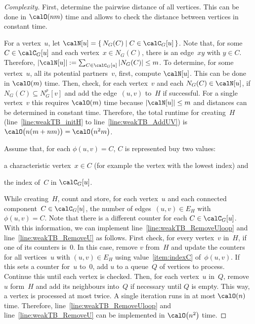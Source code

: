\begin{proof}
    [Complexity]
First, determine the pairwise distance of all vertices.
This can be done in $\calO(nm)$ time and allows to check the distance between vertices in constant time.

For a vertex~$u$, let $\calN[u] = \{ \, N_G(C) \mid C \in \calC_G[u] \, \}$.
Note that, for some $C \in \calC_G[u]$ and each vertex~$x \in N_G(C)$, there is an edge~$xy$ with $y \in C$.
Therefore, $|\calN[u]| := \sum_{C \in \calC_G[u]} |N_G(C)| \leq m$.
To determine, for some vertex~$u$, all its potential partners~$v$, first, compute $\calN[u]$.
This can be done in $\calO(m)$ time.
Then, check, for each vertex~$v$ and each $N_G(C) \in \calN[u]$, if $N_G(C) \subseteq N_G^\rho[v]$ and add the edge~$(u, v)$ to~$H$ if successful.
For a single vertex~$v$ this requires $\calO(m)$ time because $|\calN[u]| \leq m$ and distances can be determined in constant time.
Therefore, the total runtime for creating~$H$ (line~\ref{line:weakTB_initH} to line~\ref{line:weakTB_AddUV}) is $\calO \big( n (m + nm) \big) = \calO \big( n^2m \big)$.

Assume that, for each $\phi(u, v) = C$, $C$ is represented buy two values:
\begin{enumerate*}[(i),mode=unboxed]
    \item
        \label{item:charVert}
        a characteristic vertex~$x \in C$ (for example the vertex with the lowest index) and
    \item
        \label{item:indexC}
        the index of~$C$ in $\calC_G[u]$.
\end{enumerate*}
While creating~$H$, count and store, for each vertex~$u$ and each connected component~$C \in \calC_G[u]$, the number of edges~$(u, v) \in E_H$ with $\phi(u, v) = C$.
Note that there is a different counter for each $C \in \calC_G[u]$.
With this information, we can implement line~\ref{line:weakTB_RemoveUloop} and line~\ref{line:weakTB_RemoveU} as follows.
First check, for every vertex~$v$ in~$H$, if one of its counters is~$0$.
In this case, remove $v$ from~$H$ and update the counters for all vertices~$u$ with $(u, v) \in E_H$ using value~\ref{item:indexC} of~$\phi(u, v)$.
If this sets a counter for~$u$ to~$0$, add $u$ to a queue~$Q$ of vertices to process.
Continue this until each vertex is checked.
Then, for each vertex~$u$ in~$Q$, remove~$u$ form~$H$ and add its neighbours into~$Q$ if necessary until $Q$ is empty.
This way, a vertex is processed at most twice.
A single iteration runs in at most $\calO(n)$ time.
Therefore, line~\ref{line:weakTB_RemoveUloop} and line~\ref{line:weakTB_RemoveU} can be implemented in $\calO \big( n^2 \big)$ time.


\end{proof}
